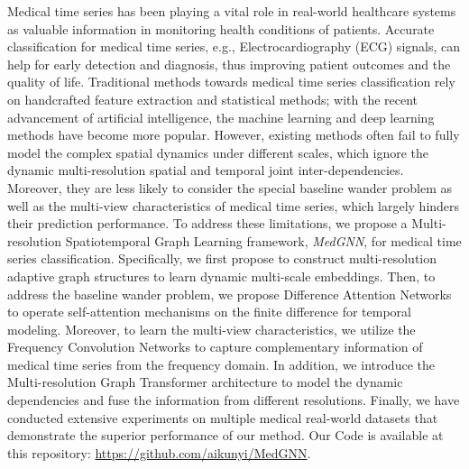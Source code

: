 Medical time series has been playing a vital role in real-world healthcare systems as valuable information in monitoring health conditions of patients. Accurate classification for medical time series, e.g., Electrocardiography (ECG) signals, can help for early detection and diagnosis, thus improving patient outcomes and the quality of life. Traditional methods towards medical time series classification rely on handcrafted feature extraction and statistical methods; with the recent advancement of artificial intelligence, the machine learning and deep learning methods have become more popular. However, existing methods often fail to fully model the complex spatial dynamics under different scales, which ignore the dynamic multi-resolution spatial and temporal joint inter-dependencies. Moreover, they are less likely to consider the special baseline wander problem as well as the multi-view characteristics of medical time series, which largely hinders their prediction performance. To address these limitations, we propose a Multi-resolution Spatiotemporal Graph Learning framework, \textit{{MedGNN}}, for medical time series classification. Specifically,  we first propose to construct multi-resolution adaptive graph structures to learn dynamic multi-scale embeddings. Then, to address the baseline wander problem, we propose Difference Attention Networks to operate self-attention mechanisms on the finite difference for temporal modeling. Moreover, to learn the multi-view characteristics, we utilize the Frequency Convolution Networks to capture complementary information of medical time series from the frequency domain. In addition, we introduce the Multi-resolution Graph Transformer architecture to model the dynamic dependencies and fuse the information from different resolutions. Finally, we have conducted extensive experiments on multiple medical real-world datasets that demonstrate the superior performance of our method. Our Code is available at this repository: \url{https://github.com/aikunyi/MedGNN}.

